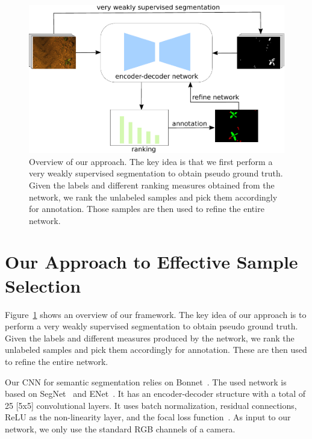 \documentclass[letterpaper, 10 pt, conference]{ieeeconf}  %
\begin{document}
    \begin{figure}
    \centering
    \includegraphics[width=\linewidth]{pics/output_system_overview.pdf}
      \caption{Overview of our approach. The key idea is that we first
        perform a very weakly supervised segmentation to obtain pseudo
        ground truth. Given the labels and different ranking measures
        obtained from the network, we rank the unlabeled samples and pick them
        accordingly for annotation. Those samples are then used to refine the entire network.}
    \label{fig:overview}        
   \end{figure}


\section{Our Approach to Effective Sample Selection}
\label{sec:approach}

Figure~\ref{fig:overview} shows an overview of our framework.
The key idea of our approach is to perform a very weakly supervised segmentation to obtain pseudo ground truth. Given the labels and different measures produced by the network, we rank the unlabeled samples and pick them accordingly for annotation. These are then used to refine the entire network.


Our CNN for semantic segmentation relies on Bonnet~\cite{milioto2018bonnet}.
The used network is based on SegNet~\cite{badrinarayanan2017segnet} and ENet~\cite{paszke2016enet}. It has an encoder-decoder structure with a total of 25 [5x5] convolutional layers. It uses batch normalization, residual connections, ReLU as the non-linearity layer, and the focal loss function~\cite{DBLP:conf/iccv/LinGGHD17}.
As input to our network, we only use the standard RGB channels of a camera.
\end{document}
